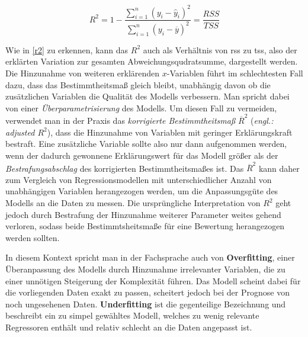 \begin{equation}
R^2 = 1 - \frac{\sum\limits_{i=1}^n (y_i - \hat{y}_i)^2}{\sum\limits_{i=1}^n (y_i - \overline{y})^2}= \frac{RSS}{TSS}
\label{r2}
\end{equation}

Wie in \vref{r2} zu erkennen, kann das $R^2$ auch als Verhältnis von \gls{rss} zu \gls{tss}, also der erklärten Variation zur gesamten Abweichungsqudratsumme, dargestellt werden. Die Hinzunahme von weiteren erklärenden $x$-Variablen führt im schlechtesten Fall dazu, dass das Bestimmtheitsmaß gleich bleibt, unabhängig davon ob die zusätzlichen Variablen die Qualität des Modells verbessern. Man spricht dabei von einer \textit{Überparametrisierung} des Modells. Um diesen Fall zu vermeiden, verwendet man in der Praxis das \textit{korrigierte Bestimmtheitsmaß} $\overline{R}^2$ (\textit{engl.: adjusted $R^2$}), dass die Hinzunahme von Variablen mit geringer Erklärungskraft bestraft. Eine zusätzliche Variable sollte also nur dann aufgenommen werden, wenn der dadurch gewonnene Erklärungswert für das Modell größer als der \textit{Bestrafungsabschlag} des korrigierten Bestimmtheitsmaßes ist. Das $\overline{R}^2$ kann daher zum Vergleich von Regressionsmodellen mit unterschiedlicher Anzahl von unabhängigen Variablen herangezogen werden, um die Anpassungsgüte des Modells an die Daten zu messen. Die ursprüngliche Interpretation von $R^2$ geht jedoch durch Bestrafung der Hinzunahme weiterer Parameter weites gehend verloren, sodass beide Bestimmtsheitsmaße für eine Bewertung herangezogen werden sollten. 

In diesem Kontext spricht man in der Fachsprache auch von \textbf{Overfitting}, einer Überanpassung des Modells durch Hinzunahme irrelevanter Variablen, die zu einer unnötigen Steigerung der Komplexität führen. Das Modell scheint dabei für die vorliegenden Daten exakt zu passen, scheitert jedoch bei der Prognose von noch ungesehenen Daten. \textbf{Underfitting} ist die gegenteilige Bezeichnung und beschreibt ein zu simpel gewähltes Modell, welches zu wenig relevante Regressoren enthält und relativ schlecht an die Daten angepasst ist. 


